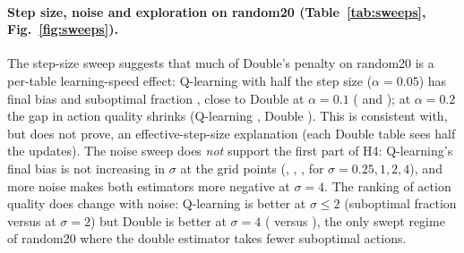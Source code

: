 \begin{table}[t]\centering
\caption{Simultaneous double update (both tables updated on each sample), mean $\pm$ std over 5 seeds.}\label{tab:both}
\resizebox{0.7\textwidth}{!}{}
\end{table}

\paragraph{Step size, noise and exploration on random20 (Table~\ref{tab:sweeps}, Fig.~\ref{fig:sweeps}).} The step-size sweep suggests that much of Double's penalty on random20 is a per-table learning-speed effect: Q-learning with half the step size ($\alpha=0.05$) has final bias  and suboptimal fraction , close to Double at $\alpha=0.1$ ( and ); at $\alpha=0.2$ the gap in action quality shrinks (Q-learning , Double ). This is consistent with, but does not prove, an effective-step-size explanation (each Double table sees half the updates). The noise sweep does \emph{not} support the first part of H4: Q-learning's final bias is not increasing in $\sigma$ at the grid points (, , ,  for $\sigma=0.25,1,2,4$), and more noise makes both estimators more negative at $\sigma=4$. The ranking of action quality does change with noise: Q-learning is better at $\sigma\le 2$ (suboptimal fraction  versus  at $\sigma=2$) but Double is better at $\sigma=4$ ( versus ), the only swept regime of random20 where the double estimator takes fewer suboptimal actions.

